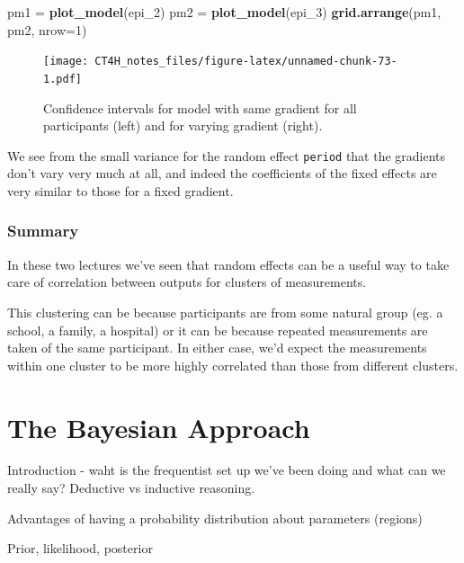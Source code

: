 \documentclass[
  openany]{book}
\newenvironment{Shaded}{\begin{snugshade}}{\end{snugshade}}
\newcommand{\AttributeTok}[1]{\textcolor[rgb]{0.13,0.29,0.53}{#1}}
\newcommand{\DecValTok}[1]{\textcolor[rgb]{0.00,0.00,0.81}{#1}}
\newcommand{\FunctionTok}[1]{\textcolor[rgb]{0.13,0.29,0.53}{\textbf{#1}}}
\newcommand{\NormalTok}[1]{#1}
\newcommand{\OtherTok}[1]{\textcolor[rgb]{0.56,0.35,0.01}{#1}}
\theoremstyle{definition}
\theoremstyle{definition}
\theoremstyle{definition}
\theoremstyle{definition}
\theoremstyle{remark}
\begin{document}
\begin{Shaded}
\begin{Highlighting}[]
\NormalTok{pm1 }\OtherTok{=} \FunctionTok{plot\_model}\NormalTok{(epi\_2)}
\NormalTok{pm2 }\OtherTok{=} \FunctionTok{plot\_model}\NormalTok{(epi\_3)}
\FunctionTok{grid.arrange}\NormalTok{(pm1, pm2, }\AttributeTok{nrow=}\DecValTok{1}\NormalTok{)}
\end{Highlighting}
\end{Shaded}

\begin{figure}
\centering
\texttt{[image: CT4H\_notes\_files/figure-latex/unnamed-chunk-73-1.pdf]}
\caption{\label{fig:unnamed-chunk-73}Confidence intervals for model with same gradient for all participants (left) and for varying gradient (right).}
\end{figure}

We see from the small variance for the random effect \texttt{period} that the gradients don't vary very much at all, and indeed the coefficients of the fixed effects are very similar to those for a fixed gradient.

\hypertarget{summary}{%
\subsection*{Summary}\label{summary}}

In these two lectures we've seen that random effects can be a useful way to take care of correlation between outputs for clusters of measurements.

This clustering can be because participants are from some natural group (eg. a school, a family, a hospital) or it can be because repeated measurements are taken of the same participant. In either case, we'd expect the measurements within one cluster to be more highly correlated than those from different clusters.

\hypertarget{the-bayesian-approach}{%
\chapter{The Bayesian Approach}\label{the-bayesian-approach}}

Introduction - waht is the frequentist set up we've been doing and what can we really say? Deductive vs inductive reasoning.

Advantages of having a probability distribution about parameters (regions)

Prior, likelihood, posterior
\end{document}
